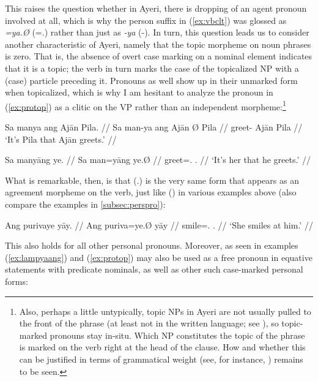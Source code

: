This raises the question whether in Ayeri, there is dropping of an agent 
pronoun involved at all, which is why the person suffix in (\ref{ex:vbclt}) was 
glossed as \emph{=ya.Ø} (\mbox{=\TsgM{}.\Top{}}) rather than just as \emph{-ya} 
(-\TsgM{}). In turn, this question leads us to consider another characteristic 
of Ayeri, namely that the topic morpheme on noun phrases is zero. That is, the 
absence of overt case marking on a nominal element indicates that it is a 
topic; the verb in turn marks the case of the topicalized NP with a (case) 
particle preceding it. Pronouns as well show up in their unmarked form when 
topicalized, which is why I am hesitant to analyze the pronoun in 
(\ref{ex:protop}) as a clitic on the VP rather than an independent 
morpheme:\footnote{Also, perhaps a little untypically, topic NPs in Ayeri are 
not usually pulled to the front of the phrase (at least not in the written 
language; see \cite[120--122]{lehmann2015}), so topic-marked pronouns stay 
in-situ. Which NP constitutes the topic of the phrase is marked on the verb 
right at the head of the clause. How and whether this can be justified in terms 
of grammatical weight (see, for instance, \cite[95--98]{wasow1997}) remains to 
be seen.}

\pex %
\a\label{ex:fullsntc}\begingl
	\gla Sa manya ang Ajān {} Pila. //
	\glb Sa man-ya ang ​Ajān Ø ​Pila //
	\glc \PatT{} greet-\TsgM{} \Aarg{} ​Ajān \Top{} ​Pila //
	\glft `It's Pila that Ajān greets.' //
\endgl

\a\label{ex:protop}\begingl
	\gla Sa manyāng ye. //
	\glb Sa man=yāng ye.Ø //
	\glc \PatT{} greet=\TsgM{}.\Aarg{} \TsgF{}.\Top{} //
	\glft `It's her that he greets.' //
\endgl

\xe

What is remarkable, then, is that  (\TsgF{}.\Top{}) is the very 
same form that appears as an agreement morpheme on the verb, just like 
 (\TsgM{}) in various examples above (also compare the examples 
in \autoref{subsec:perspro}):

\ex %
\begingl
	\gla Ang purivaye yāy. //
	\glb Ang puriva=ye.Ø yāy //
	\glc \AgtT{} smile=\TsgF{}.\Top{} \TsgM{}.\Loc{} //
	\glft `She smiles at him.' //
\endgl\xe

This also holds for all other personal pronouns. Moreover, 
 as seen in examples (\ref{ex:lampyaang}) and 
(\ref{ex:protop}) may also be used as a free pronoun in equative statements 
with predicate nominals, as well as other such case-marked personal forms:

